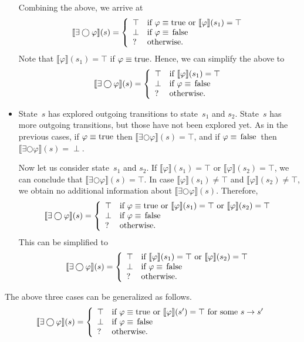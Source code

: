 \documentclass[12pt]{article}
\newcommand{\nxt}{\bigcirc}
\newcommand{\TRUE}{\mbox{\lstinline{true}}}
\newcommand{\FALSE}{\mbox{\lstinline{false}}}
\theoremstyle{definition}
\newcommand{\satisfaction}[1]{\llbracket #1 \rrbracket}
\begin{document}
\begin{itemize}
Combining the above, we arrive at
\[
\satisfaction{\exists \nxt \varphi}(s) = \left \{
\begin{array}{ll}
\top & \mbox{if $\varphi \equiv \TRUE$ or $\satisfaction{\varphi}(s_1) = \top$}\\
\perp & \mbox{if $\varphi \equiv \FALSE$}\\
? & \mbox{otherwise.}
\end{array}
\right .
\]
Note that $\satisfaction{\varphi}(s_1) = \top$ if $\varphi \equiv \TRUE$.  Hence, we can simplify the above to
\[
\satisfaction{\exists \nxt \varphi}(s) = \left \{
\begin{array}{ll}
\top & \mbox{if $\satisfaction{\varphi}(s_1) = \top$}\\
\perp & \mbox{if $\varphi \equiv \FALSE$}\\
? & \mbox{otherwise.}
\end{array}
\right .
\]
\item
State~$s$ has explored outgoing transitions to state~$s_1$ and $s_2$.  State~$s$ has more outgoing transitions, but those have not been explored yet.   As in the previous cases, if  $\varphi \equiv \TRUE$ then $\satisfaction{\exists \nxt \varphi}(s) = \top$, and if $\varphi \equiv \FALSE$ then $\satisfaction{\exists \nxt \varphi}(s) = \perp$. 

Now let us consider state~$s_1$ and $s_2$.  If $\satisfaction{\varphi}(s_1) = \top$ or $\satisfaction{\varphi}(s_2) = \top$, we can conclude that $\satisfaction{\exists \nxt \varphi}(s) = \top$.  In case $\satisfaction{\varphi}(s_1)\not= \top$ and $\satisfaction{\varphi}(s_2)\not= \top$, we obtain no additional information about $\satisfaction{\exists \nxt \varphi}(s)$.  Therefore,
\[
\satisfaction{\exists \nxt \varphi}(s) = \left \{
\begin{array}{ll}
\top & \mbox{if $\varphi \equiv \TRUE$ or $\satisfaction{\varphi}(s_1) = \top$ or $\satisfaction{\varphi}(s_2) = \top$}\\
\perp & \mbox{if $\varphi \equiv \FALSE$}\\
? & \mbox{otherwise.}
\end{array}
\right .
\]
This can be simplified to
\[
\satisfaction{\exists \nxt \varphi}(s) = \left \{
\begin{array}{ll}
\top & \mbox{if $\satisfaction{\varphi}(s_1) = \top$ or $\satisfaction{\varphi}(s_2) = \top$}\\
\perp & \mbox{if $\varphi \equiv \FALSE$}\\
? & \mbox{otherwise.}
\end{array}
\right .
\]
\end{itemize}
The above three cases can be generalized as follows.
\[
\satisfaction{\exists \nxt \varphi}(s) = \left \{
\begin{array}{ll}
\top & \mbox{if $\varphi \equiv \TRUE$ or $\satisfaction{\varphi}(s') = \top$ for some $s \rightarrow s'$}\\
\perp & \mbox{if $\varphi \equiv \FALSE$}\\
? & \mbox{otherwise.}
\end{array}
\right .
\]
\end{document}
